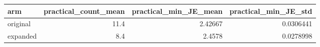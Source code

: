 \begin{tabular}{lrrr}
\toprule
arm & practical\_count\_mean & practical\_min\_JE\_mean & practical\_min\_JE\_std \\
\midrule
original & 11.4 & 2.42667 & 0.0306441 \\
expanded & 8.4 & 2.4578 & 0.0278998 \\
\bottomrule
\end{tabular}
